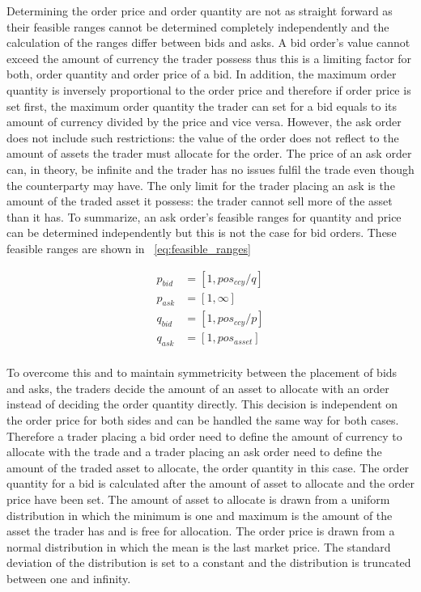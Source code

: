 Determining the order price and order quantity are not as straight
forward as their feasible ranges cannot be determined completely independently
and the calculation of the ranges differ between bids and asks. A bid order's
value cannot exceed the amount of currency the trader possess thus this is 
a limiting factor for both, order quantity and order price of a bid. In addition,
the maximum order quantity is inversely proportional to the order price and
therefore if order price is set first, the maximum order quantity the trader
can set for a bid equals to its amount of currency divided by the price and vice versa. 
However, the ask order does not include such restrictions: the value of the order
does not reflect to the amount of assets the trader must allocate for the order. The
price of an ask order can, in theory, be infinite and the trader has no issues
fulfil the trade even though the counterparty may have. The only limit for the
trader placing an ask is the amount of the traded asset it possess: the trader
cannot sell more of the asset than it has. To summarize, an ask order's feasible
ranges for quantity and price can be determined independently but this is not the
case for bid orders. These feasible ranges are shown in ~\ref{eq:feasible_ranges}

\begin{equation}
\begin{aligned}
p_{bid} &= \left[1, pos_{ccy} / q \right] \\
p_{ask} &= \left[1, \infty \right] \\
q_{bid} &= \left[1, pos_{ccy} / p\right] \\
q_{ask} &= \left[1, pos_{asset}\right] \\
\end{aligned}
\label{eq:feasible_ranges}
\end{equation}

To overcome this and to maintain symmetricity between the placement of bids and asks, 
the traders decide the amount of an asset to allocate with an order instead of deciding 
the order quantity directly. This decision is independent on the order price for both
sides and can be handled the same way for both cases. Therefore a trader placing a bid order 
need to define the amount of currency to allocate with the trade and a trader placing an ask
order need to define the amount of the traded asset to allocate, the order quantity in this case. 
The order quantity for a bid is calculated after the amount of asset to allocate 
and the order price have been set. The amount of asset to allocate is drawn from a uniform
distribution in which the minimum is one and maximum is the amount of the asset the trader
has and is free for allocation. The order price is drawn from a normal distribution in which 
the mean is the last market price. The standard deviation of the distribution is set to a 
constant and the distribution is truncated between one and infinity.

